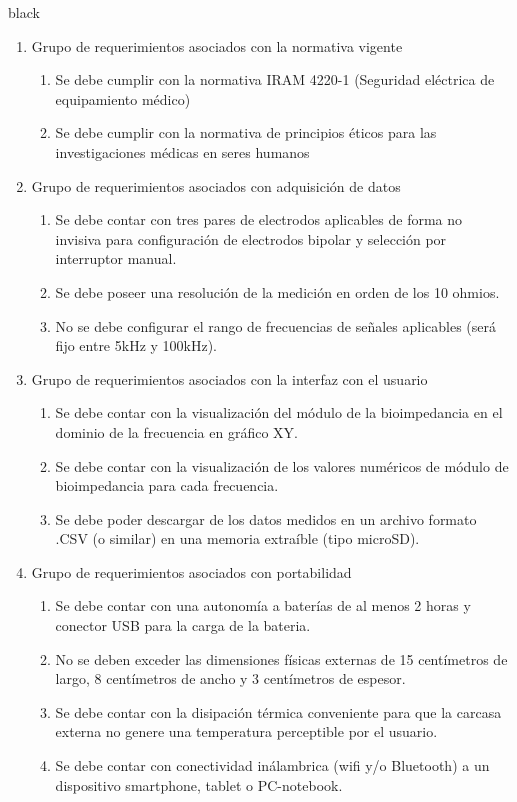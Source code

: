 \documentclass[11pt]{charter}
\begin{document}
\begin{consigna}{black}
\begin{enumerate}
\item Grupo de requerimientos asociados con la normativa vigente
	\begin{enumerate}
	\item Se debe cumplir con la normativa IRAM 4220-1 (Seguridad eléctrica de equipamiento médico)
	\item Se debe cumplir con la normativa de principios éticos para las investigaciones médicas en seres humanos
	\end{enumerate}

\item Grupo de requerimientos asociados con adquisición de datos
	\begin{enumerate}
	\item Se debe contar con tres pares de electrodos aplicables de forma no invisiva para configuración de electrodos bipolar y selección por interruptor manual.
	\item Se debe poseer una resolución de la medición en orden de los 10 ohmios.
	\item No se debe configurar el rango de frecuencias de señales aplicables (será fijo entre 5kHz y 100kHz).
	\end{enumerate}

\item Grupo de requerimientos asociados con la interfaz con el usuario
	\begin{enumerate}
	\item Se debe contar con la visualización del módulo de la bioimpedancia en el dominio de la frecuencia en gráfico XY.
	\item Se debe contar con la visualización de los valores numéricos de módulo de bioimpedancia para cada frecuencia.
	\item Se debe poder descargar de los datos medidos en un archivo formato .CSV (o similar) en una memoria extraíble (tipo microSD).
	\end{enumerate}

\item Grupo de requerimientos asociados con portabilidad
	\begin{enumerate}
	\item Se debe contar con una autonomía a baterías de al menos 2 horas y conector USB para la carga de la bateria.
	\item No se deben exceder las dimensiones físicas externas de 15 centímetros de largo, 8 centímetros de ancho y 3 centímetros de espesor.
	\item Se debe contar con la disipación térmica conveniente para que la carcasa externa no genere una temperatura perceptible por el usuario.
	\item Se debe contar con conectividad inálambrica (wifi y/o Bluetooth) a un dispositivo smartphone, tablet o PC-notebook.
	\end{enumerate}
	
\end{enumerate}
\end{consigna}
\end{document}
